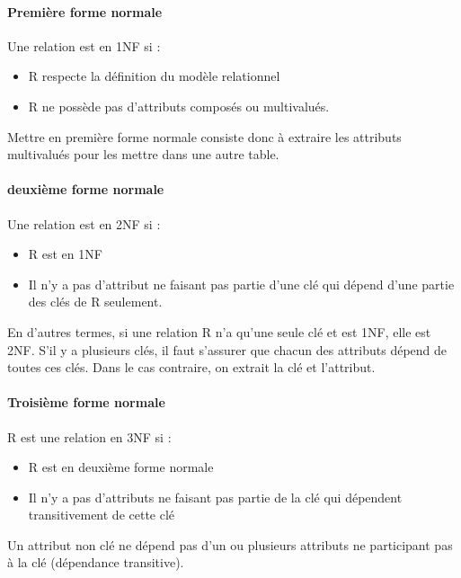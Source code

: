 \paragraph{Première forme normale}
Une relation est en 1NF si : 
\begin{itemize}
	\item R respecte la définition du modèle relationnel
	\item R ne possède pas d'attributs composés ou multivalués.
\end{itemize}
Mettre en première forme normale consiste donc à extraire les attributs multivalués pour les mettre dans une autre table.

\paragraph{deuxième forme normale}
Une relation est en 2NF si : 
\begin{itemize}
	\item R est en 1NF
	\item Il n'y a pas d'attribut ne faisant pas partie d'une clé qui dépend 
	d'une partie des clés de R seulement.
\end{itemize}
En d'autres termes, si une relation R n'a qu'une seule clé et est 1NF, 
elle est 2NF. S'il y a plusieurs clés, il faut s'assurer que chacun des attributs 
dépend de toutes ces clés. Dans le cas contraire, on extrait la clé et l'attribut.


\paragraph{Troisième forme normale}
R est une relation en 3NF si : 
\begin{itemize}
	\item R est en deuxième forme normale
	\item Il n'y a pas d'attributs ne faisant pas partie de la clé qui dépendent 
	transitivement de cette clé
\end{itemize}

Un attribut non clé ne dépend pas d'un ou plusieurs attributs ne participant pas à la clé (dépendance transitive).